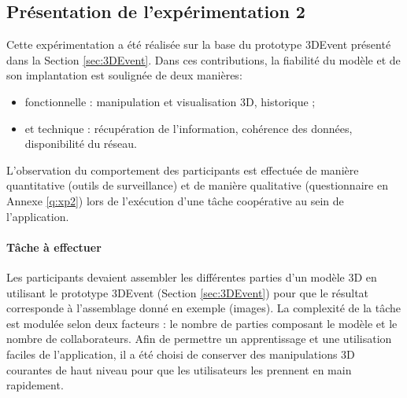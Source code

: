 

\subsection{Présentation de l'expérimentation 2}
 Cette expérimentation a été réalisée sur la base du prototype 3DEvent présenté 
 dans la Section \ref{sec:3DEvent}. Dans ces contributions, la fiabilité 
du modèle et de son implantation est soulignée de deux manières: 
\begin{itemize}
	\item fonctionnelle : manipulation et visualisation 
	3D, historique ;
	\item et technique : récupération de l'information, cohérence des 
	données, disponibilité du réseau.
\end{itemize}

L'observation du comportement des participants est 
effectuée de manière quantitative (outils de surveillance) et de manière qualitative 
(questionnaire en Annexe \ref{q:xp2}) lors de l'exécution d'une tâche 
coopérative au sein de l'application.


\paragraph{Tâche à effectuer}
Les participants devaient assembler les différentes parties d'un modèle \gls{3D} en 
utilisant le prototype 3DEvent (Section \ref{sec:3DEvent}) pour que le résultat 
corresponde à l'assemblage donné en exemple (images). 
La complexité de la tâche est modulée selon deux facteurs : le nombre de parties 
composant le modèle et le nombre de collaborateurs. 
Afin de permettre un apprentissage et une utilisation faciles de l'application, il a 
été choisi de conserver des manipulations 3D courantes de haut niveau pour que 
les utilisateurs les prennent en main rapidement.
